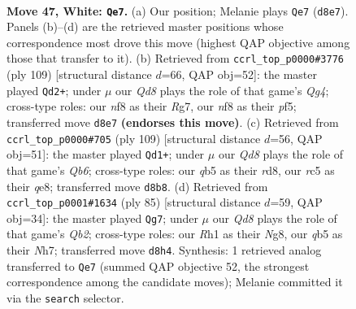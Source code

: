 \documentclass[11pt]{article}
\begin{document}
\clearpage

\begin{figure}[p]\centering
\begin{subfigure}{0.46\textwidth}\centering
\resizebox{\linewidth}{!}{%
\newchessgame
\chessboard[
  setfen={3Q1nk1/1p5p/8/1qr4p/8/6N1/R5K1/7R w - - 6 47},
  showmover=false,
  pgfstyle=straightmove, color=movearrow, markmove={d8-e7}
]}
\caption{}
\end{subfigure}\hfill
\begin{subfigure}{0.46\textwidth}\centering
\resizebox{\linewidth}{!}{%
\newchessgame
\chessboard[
  setfen={8/6rk/8/4QPq1/p7/P4PN1/1P4K1/8 b - - 2 55},
  showmover=false,
  pgfstyle=straightmove, color=movearrow, markmove={g5-d2}
]}
\caption{}
\end{subfigure}
\\[4pt]
\begin{subfigure}{0.46\textwidth}\centering
\resizebox{\linewidth}{!}{%
\newchessgame
\chessboard[
  setfen={3RQ3/6rk/4p2b/4P3/5P1P/1q1N1K2/8/8 b - - 8 55},
  showmover=false,
  pgfstyle=straightmove, color=movearrow, markmove={b3-d1}
]}
\caption{}
\end{subfigure}\hfill
\begin{subfigure}{0.46\textwidth}\centering
\resizebox{\linewidth}{!}{%
\newchessgame
\chessboard[
  setfen={6nk/1q5n/8/8/3PN1P1/2P2Q2/2r5/5RK1 b - - 0 43},
  showmover=false,
  pgfstyle=straightmove, color=movearrow, markmove={b7-g7}
]}
\caption{}
\end{subfigure}
\caption{\textbf{Move 47, White: \texttt{Qe7}.} (a) Our position; Melanie plays \texttt{Qe7} (\texttt{d8e7}). Panels (b)--(d) are the retrieved master positions whose correspondence most drove this move (highest QAP objective among those that transfer to it). (b) Retrieved from \texttt{ccrl\_top\_p0000\#3776} (ply 109) [structural distance $d$=66, QAP obj=52]: the master played \texttt{Qd2+}; under $\mu$ our \emph{Qd8} plays the role of that game's \emph{Qg4}; cross-type roles: our \emph{n}f8 as their \emph{R}g7, our \emph{n}f8 as their \emph{p}f5; transferred move \texttt{d8e7} \textbf{(endorses this move)}. (c) Retrieved from \texttt{ccrl\_top\_p0000\#705} (ply 109) [structural distance $d$=56, QAP obj=51]: the master played \texttt{Qd1+}; under $\mu$ our \emph{Qd8} plays the role of that game's \emph{Qb6}; cross-type roles: our \emph{q}b5 as their \emph{r}d8, our \emph{r}c5 as their \emph{q}e8; transferred move \texttt{d8b8}. (d) Retrieved from \texttt{ccrl\_top\_p0001\#1634} (ply 85) [structural distance $d$=59, QAP obj=34]: the master played \texttt{Qg7}; under $\mu$ our \emph{Qd8} plays the role of that game's \emph{Qb2}; cross-type roles: our \emph{R}h1 as their \emph{N}g8, our \emph{q}b5 as their \emph{N}h7; transferred move \texttt{d8h4}. Synthesis: 1 retrieved analog transferred to \texttt{Qe7} (summed QAP objective 52, the strongest correspondence among the candidate moves); Melanie committed it via the \texttt{search} selector.}
\label{fig:thought-m92}
\end{figure}
\end{document}
